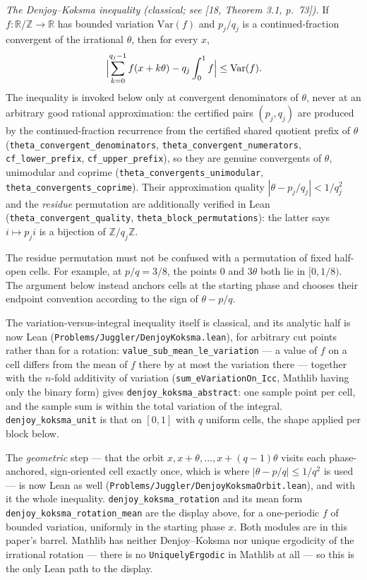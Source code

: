 \documentclass[12pt]{article}
\begin{document}
\emph{The Denjoy--Koksma inequality (classical; see {[}18, Theorem 3.1,
p.~73{]}).} If \(f:\mathbb R/\mathbb Z\to\mathbb R\) has bounded
variation \(\mathrm{Var}(f)\) and \(p_j/q_j\) is a continued-fraction
convergent of the irrational \(\theta\), then for every \(x\), \[
\Bigl|\sum_{k=0}^{q_j-1}f(x+k\theta)-q_j\int_0^1 f\Bigr|
\le\mathrm{Var}(f).
\] The inequality is invoked below only at convergent denominators of
\(\theta\), never at an arbitrary good rational approximation: the
certified pairs \((p_j,q_j)\) are produced by the continued-fraction
recurrence from the certified shared quotient prefix of \(\theta\)
(\texttt{\nolinkurl{theta_convergent_denominators}},
\texttt{\nolinkurl{theta_convergent_numerators}},
\texttt{\nolinkurl{cf_lower_prefix}},
\texttt{\nolinkurl{cf_upper_prefix}}), so they are genuine convergents
of \(\theta\), unimodular and coprime
(\texttt{\nolinkurl{theta_convergents_unimodular}},
\texttt{\nolinkurl{theta_convergents_coprime}}). Their approximation
quality \(|\theta-p_j/q_j|<1/q_j^2\) and the \emph{residue} permutation
are additionally verified in Lean
(\texttt{\nolinkurl{theta_convergent_quality}},
\texttt{\nolinkurl{theta_block_permutations}}): the latter says
\(i\mapsto p_ji\) is a bijection of \(\mathbb Z/q_j\mathbb Z\).

The residue permutation must not be confused with a permutation of fixed
half-open cells. For example, at \(p/q=3/8\), the points \(0\) and
\(3\theta\) both lie in \([0,1/8)\). The argument below instead anchors
cells at the starting phase and chooses their endpoint convention
according to the sign of \(\theta-p/q\).

The variation-versus-integral inequality itself is classical, and its
analytic half is now Lean
(\texttt{\nolinkurl{Problems/Juggler/DenjoyKoksma.lean}}), for arbitrary
cut points rather than for a rotation:
\texttt{\nolinkurl{value_sub_mean_le_variation}} --- a value of \(f\) on
a cell differs from the mean of \(f\) there by at most the variation
there --- together with the \(n\)-fold additivity of variation
(\texttt{\nolinkurl{sum_eVariationOn_Icc}}, Mathlib having only the
binary form) gives \texttt{\nolinkurl{denjoy_koksma_abstract}}: one
sample point per cell, and the sample sum is within the total variation
of the integral. \texttt{\nolinkurl{denjoy_koksma_unit}} is that on
\([0,1]\) with \(q\) uniform cells, the shape applied per block below.

The \emph{geometric} step --- that the orbit
\(x, x+\theta, \ldots, x+(q-1)\theta\) visits each phase-anchored,
sign-oriented cell exactly once, which is where
\(|\theta-p/q|\le 1/q^2\) is used --- is now Lean as well
(\texttt{\nolinkurl{Problems/Juggler/DenjoyKoksmaOrbit.lean}}), and with
it the whole inequality. \texttt{\nolinkurl{denjoy_koksma_rotation}} and
its mean form \texttt{\nolinkurl{denjoy_koksma_rotation_mean}} are the
display above, for a one-periodic \(f\) of bounded variation, uniformly
in the starting phase \(x\). Both modules are in this paper's barrel.
Mathlib has neither Denjoy--Koksma nor unique ergodicity of the
irrational rotation --- there is no \texttt{\nolinkurl{UniquelyErgodic}}
in Mathlib at all --- so this is the only Lean path to the display.
\end{document}
